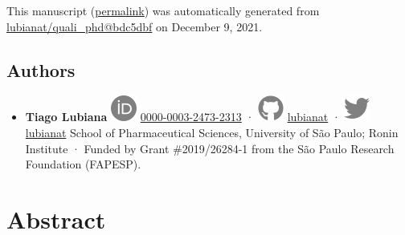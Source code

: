 This manuscript
(\href{https://lubianat.github.io/quali_phd/v/bdc5dbf4cb3698c1da65b9939fa935424b927361/}{permalink})
was automatically generated
from \href{https://github.com/lubianat/quali_phd/tree/bdc5dbf4cb3698c1da65b9939fa935424b927361}{lubianat/quali\_phd@bdc5dbf}
on December 9, 2021.

\hypertarget{authors}{%
\subsection{Authors}\label{authors}}

\begin{itemize}
\tightlist
\item
  \textbf{Tiago Lubiana}
  \includegraphics{images/orcid.svg}
  \href{https://orcid.org/0000-0003-2473-2313}{0000-0003-2473-2313}
  · \includegraphics{images/github.svg}
  \href{https://github.com/lubianat}{lubianat}
  · \includegraphics{images/twitter.svg}
  \href{https://twitter.com/lubianat}{lubianat}
  School of Pharmaceutical Sciences, University of São Paulo; Ronin Institute
  · Funded by Grant \#2019/26284-1 from the São Paulo Research Foundation (FAPESP).
\end{itemize}

\hypertarget{abstract}{%
\section{Abstract}\label{abstract}}

